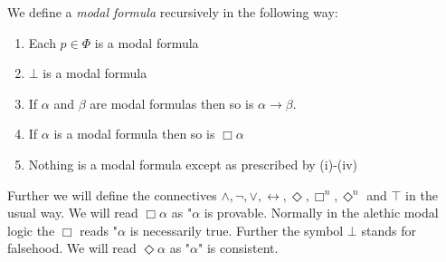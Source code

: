 \documentclass[../main.tex]{subfiles}
\begin{document}
\begin{defi}
	We define a \textit{modal formula} recursively in the following way:
	\begin{enumerate}[label=\roman*]
		\item Each $p\in\Phi$ is a modal formula
		\item $\bot$ is a modal formula
		\item If $\alpha$ and $\beta$ are modal formulas then so is
			$\alpha\rightarrow\beta$.
		\item If $\alpha$ is a modal formula then so is $\Box\alpha$
		\item Nothing is a modal formula except as prescribed by
			(i)-(iv)
	\end{enumerate}
\end{defi}
Further we will define the connectives $\wedge,\neg,\vee,\leftrightarrow,
\Diamond, \Box^n,\Diamond^n$ and $\top$
in the usual way. 
We will read $\Box\alpha$ as "$\alpha$ is provable. Normally in the alethic modal logic the
$\Box$ reads "$\alpha$ is necessarily true. Further the symbol $\bot$ stands
for falsehood. We will read $\Diamond \alpha$ as "$\alpha$" is consistent.
\end{document}
